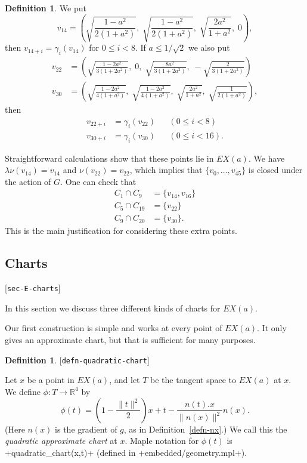 \documentclass[reqno]{amsart}
\newcommand{\lbl}[1]{\label{#1}\textup{[\texttt{#1}]}\par}
\newcommand{\lbl}{\label}
\newcommand{\gm}        {\gamma}
\newcommand{\lm}        {\lambda}
\newcommand{\R}         {{\mathbb{R}}}
\newcommand{\rt}        {\sqrt{2}}
\renewcommand{\:}{\colon}
\theoremstyle{definition}
\newtheorem{definition}[theorem]{Definition}
\begin{document}
\begin{definition}
 We put
 \[
  v_{14}  = \left(\sqrt{\frac{1-a^2}{2(1+a^2)}},\;
                  \sqrt{\frac{1-a^2}{2(1+a^2)}},\;
                  \sqrt{\frac{2a^2}{1+a^2}},\;
                  0\right),
 \]
 then $v_{14+i}=\gm_i(v_{14})$ for $0\leq i<8$.  If
 $a\leq 1/\rt$ we also put
 \begin{align*}
  v_{22} &= \left(
             \sqrt{\frac{1-2a^2}{3(1+2a^2)}},\;
             0,\;
             \sqrt{\frac{8a^2}{3(1+2a^2)}},\;
             -\sqrt{\frac{2}{3(1+2a^2)}}
            \right) \\
  v_{30} &= \left(
             \sqrt{\frac{1-2a^2}{4(1+a^2)}},\;
             \sqrt{\frac{1-2a^2}{4(1+a^2)}},\;
             \sqrt{\frac{2a^2}{1+a^2}},\;
             \sqrt{\frac{1}{2(1+a^2)}}
            \right),
 \end{align*}
 then
 \begin{align*}
  v_{22+i} &= \gm_i(v_{22}) && (0\leq i<8) \\
  v_{30+i} &= \gm_i(v_{30}) && (0\leq i<16).
 \end{align*}
\end{definition}

Straightforward calculations show that these points lie in $EX(a)$.
We have $\lm\nu(v_{14})=v_{14}$ and $\nu(v_{22})=v_{22}$, which
implies that $\{v_0,\dotsc,v_{45}\}$ is closed under the action of
$G$.  One can check that
\begin{align*}
 C_1\cap C_9    &= \{v_{14},v_{16}\} \\
 C_5\cap C_{19} &= \{v_{22}\} \\
 C_9\cap C_{20} &= \{v_{30}\}.
\end{align*}
This is the main justification for considering these extra points.

\subsection{Charts}
\lbl{sec-E-charts}

In this section we discuss three different kinds of charts for $EX(a)$.

Our first construction is simple and works at every point of $EX(a)$.  It
only gives an approximate chart, but that is sufficient for many
purposes.

\begin{definition}\lbl{defn-quadratic-chart}
 Let $x$ be a point in $EX(a)$, and let $T$ be the tangent space to
 $EX(a)$ at $x$.  We define $\phi\:T\to\R^4$ by
 \[ \phi(t) = \left(1 - \frac{\|t\|^2}{2}\right)x + t
               - \frac{n(t).x}{\|n(x)\|^2}n(x).
 \]
 (Here $n(x)$ is the gradient of $g$, as in Definition~\ref{defn-nx}.)
 We call this the \emph{quadratic approximate chart} at $x$.  Maple
 notation for $\phi(t)$ is \mcode+quadratic_chart(x,t)+ (defined in
 \fname+embedded/geometry.mpl+).
\end{definition}
\end{document}
